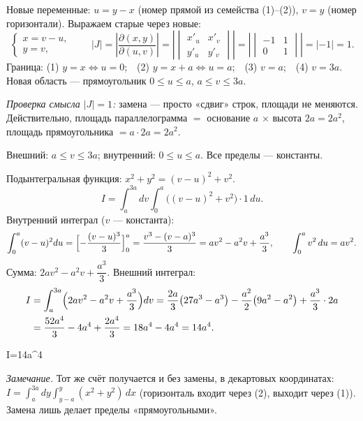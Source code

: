 Новые переменные: $u=y-x$ (номер прямой из семейства (1)--(2)), $v=y$ (номер горизонтали). Выражаем старые через новые:
\[
\begin{cases}x=v-u,\\ y=v,\end{cases}
\qquad
|J|=\left|\frac{\partial(x,y)}{\partial(u,v)}\right|=\left|\begin{vmatrix}x'_u&x'_v\\ y'_u&y'_v\end{vmatrix}\right|=\left|\begin{vmatrix}-1&1\\ 0&1\end{vmatrix}\right|=|-1|=1 .
\]
Граница: (1) $y=x\iff u=0$;\ \ (2) $y=x+a\iff u=a$;\ \ (3) $v=a$;\ \ (4) $v=3a$. Новая область --- прямоугольник $0\leqslant u\leqslant a$, $a\leqslant v\leqslant3a$.

\emph{Проверка смысла $|J|=1$:} замена --- просто «сдвиг» строк, площади не меняются. Действительно, площадь параллелограмма $=$ основание $a$ $\times$ высота $2a=2a^2$, площадь прямоугольника $=a\cdot2a=2a^2$.

Внешний: $a\leqslant v\leqslant 3a$; внутренний: $0\leqslant u\leqslant a$. Все пределы --- константы.

Подынтегральная функция: $x^2+y^2=(v-u)^2+v^2$.
\[
I=\int_a^{3a}dv\int_0^a\bigl((v-u)^2+v^2\bigr)\cdot 1\,du .
\]
Внутренний интеграл ($v$ --- константа):
\[
\int_0^a(v-u)^2du=\Bigl[-\frac{(v-u)^3}{3}\Bigr]_0^a=\frac{v^3-(v-a)^3}{3}=av^2-a^2v+\frac{a^3}{3},\qquad
\int_0^a v^2\,du=av^2 .
\]
Сумма: $2av^2-a^2v+\dfrac{a^3}{3}$. Внешний интеграл:
\[
\begin{aligned}I&=\int_a^{3a}\Bigl(2av^2-a^2v+\frac{a^3}{3}\Bigr)dv
=\frac{2a}{3}\bigl(27a^3-a^3\bigr)-\frac{a^2}{2}\bigl(9a^2-a^2\bigr)+\frac{a^3}{3}\cdot2a\\
&=\frac{52a^4}{3}-4a^4+\frac{2a^4}{3}=18a^4-4a^4=14a^4 .\end{aligned}
\]

\begin{answerbox}
I=14a^4
\end{answerbox}

\emph{Замечание.} Тот же счёт получается и без замены, в декартовых координатах: $I=\int_a^{3a}dy\int_{y-a}^{y}(x^2+y^2)\,dx$ (горизонталь входит через (2), выходит через (1)). Замена лишь делает пределы «прямоугольными».


